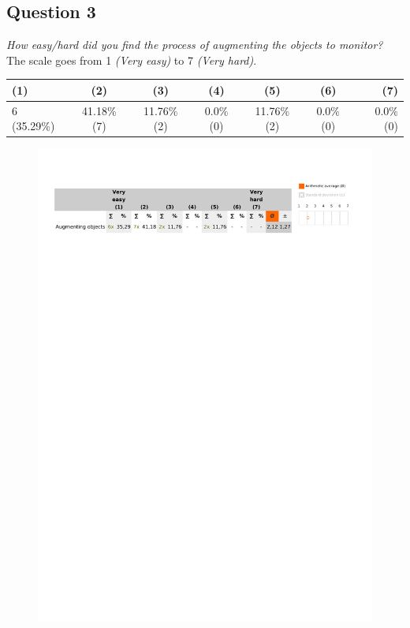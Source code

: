 \subsection{Question 3}\label{question2:3}
\emph{How easy/hard did you find the process of augmenting the objects to monitor?}\\

The scale goes from 1 \emph{(Very easy)} to 7 \emph{(Very hard)}.
\begin{table}[H]
	\begin{center}
		\small \begin{tabular*}{1.15\columnwidth}{lcccccr}
			\\ \hline \hline
			(1) & (2) & (3) & (4) & (5) & (6) & (7) \\ \hline \hline

		 	6 (35.29\%) & 41.18\% (7) & 11.76\% (2) & 0.0\% (0) & 11.76\% (2) & 0.0\% (0) & 0.0\% (0)\\ \hline
		\end{tabular*}
	\end{center}
\end{table}

\begin{figure}[H]
	\centering
	\includegraphics[width=0.6\linewidth]{gfx/Chapter_EvaluationResults/ChildproofTask/question3}
\end{figure}

